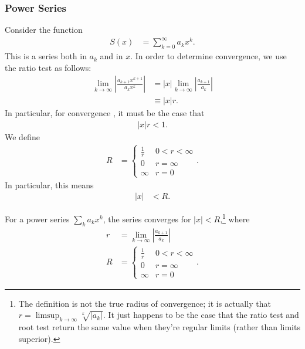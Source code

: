 \documentclass[10pt]{mypackage}
\begin{document}
\subsubsection{Power Series}%
Consider the function
\begin{align*}
  S(x) &= \sum_{k=0}^{\infty}a_kx^k.
\end{align*}
This is a series both in $a_k$ and in $x$. In order to determine convergence, we use the ratio test as follows:
\begin{align*}
  \lim_{k\rightarrow\infty}\left\vert \frac{a_{k+1}x^{k+1}}{a_kx^k} \right\vert &= \left\vert x \right\vert\lim_{k\rightarrow\infty}\left\vert \frac{a_{k+1}}{a_k} \right\vert\\
                                                                                &\equiv \left\vert x \right\vert r.
\end{align*}
In particular, for convergence , it must be the case that
\begin{align*}
  \left\vert x \right\vert r < 1.
\end{align*}
We define
\begin{align*}
  R &= \begin{cases}
    \frac{1}{r} & 0 < r < \infty\\
    0 & r = \infty\\
    \infty & r = 0
  \end{cases}.
\end{align*}
In particular, this means
\begin{align*}
  |x| &< R.
\end{align*}
\begin{definition}
  For a power series $\sum_{k}a_kx^k$, the series converges for $|x| < R$,\footnote{The definition is not the true radius of convergence; it is actually that $r = \limsup_{k\rightarrow\infty}\sqrt[k]{\left|a_k\right|}$. It just happens to be the case that the ratio test and root test return the same value when they're regular limits (rather than limits superior).} where
  \begin{align*}
    r &= \lim_{k\rightarrow\infty}\left\vert \frac{a_{k+1}}{a_k} \right\vert\\
    R &= \begin{cases}
      \frac{1}{r} & 0 < r < \infty\\
      0 & r = \infty\\
      \infty & r=0
    \end{cases}.
  \end{align*}
\end{definition}
\end{document}
